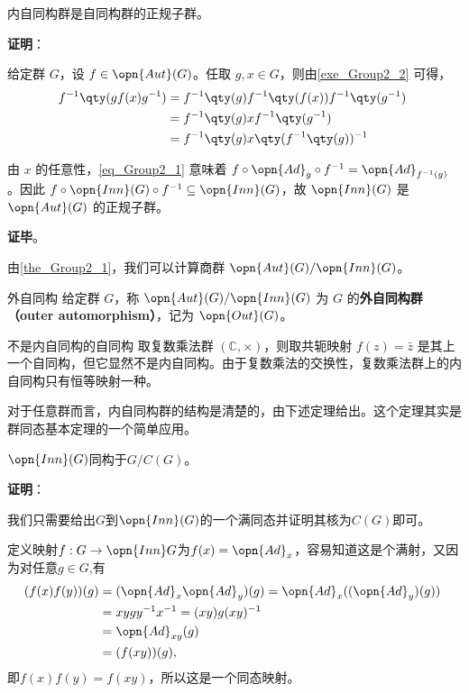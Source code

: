 \begin{theorem}{}\label{the_Group2_1}
内自同构群是自同构群的正规子群。
\end{theorem}

\textbf{证明}：

给定群 $G$，设 $f\in \opn{Aut}(G)$。任取 $g, x\in G$，则由\autoref{exe_Group2_2} 可得，
\begin{equation}\label{eq_Group2_1}
\begin{aligned}
f^{-1}\qty(gf(x)g^{-1})&=f^{-1}\qty(g)f^{-1}\qty(f(x))f^{-1}\qty(g^{-1})\\
&=f^{-1}\qty(g)xf^{-1}\qty(g^{-1})\\
&=f^{-1}\qty(g)x\qty(f^{-1}\qty(g))^{-1}
\end{aligned}~
\end{equation}

由 $x$ 的任意性，\autoref{eq_Group2_1} 意味着 $f\circ \opn{Ad}_g\circ f^{-1}=\opn{Ad}_{f^{-1}(g)}$。因此 $f\circ\opn{Inn}(G)\circ f^{-1}\subseteq\opn{Inn}(G)$，故 $\opn{Inn}(G)$ 是 $\opn{Aut}(G)$ 的正规子群。

\textbf{证毕}。

由\autoref{the_Group2_1}，我们可以计算商群 $\opn{Aut}(G)/\opn{Inn}(G)$。

\begin{definition}{外自同构}
给定群 $G$，称 $\opn{Aut}(G)/\opn{Inn}(G)$ 为 $G$ 的\textbf{外自同构群（outer automorphism）}，记为 $\opn{Out} (G)$。
\end{definition}

\begin{example}{不是内自同构的自同构}
取复数乘法群 $(\mathbb{C}, \times)$，则取共轭映射 $f(z)=\bar{z}$ 是其上一个自同构，但它显然不是内自同构。由于复数乘法的交换性，复数乘法群上的内自同构只有恒等映射一种。
\end{example}

对于任意群而言，内自同构群的结构是清楚的，由下述定理给出。这个定理其实是群同态基本定理的一个简单应用。

\begin{theorem}{}\label{the_Group2_2}
$\opn{Inn}(G)$同构于$G/C(G)$。
\end{theorem}

\textbf{证明}：

我们只需要给出$G$到$\opn{Inn}(G)$的一个满同态并证明其核为$C(G)$即可。

定义映射$f:G\to \opn{Inn} G$为$f(x)=\opn{Ad}_x$，容易知道这是个满射，又因为对任意$g\in G$,有
\begin{equation}
\begin{split}
(f(x)f(y))(g)&=(\opn{Ad}_x\opn{Ad}_y)(g)=\opn{Ad}_x((\opn{Ad}_y)(g))\\
&=xygy^{-1}x^{-1}=(xy)g(xy)^{-1}\\
&=\opn{Ad}_{xy}(g)\\
&=(f(xy))(g),
\end{split}~
\end{equation}
即$f(x)f(y)=f(xy)$，所以这是一个同态映射。

